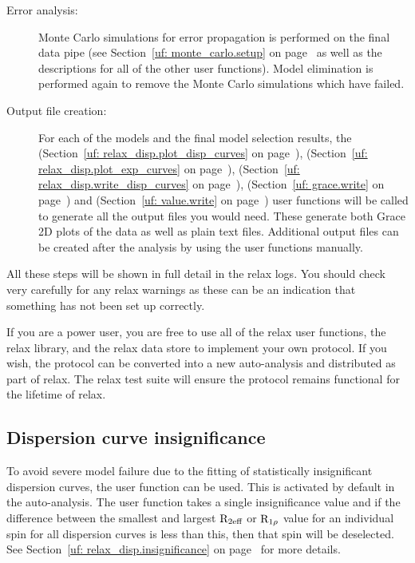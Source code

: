 \begin{description}
\item[Error analysis:]  Monte Carlo simulations for error propagation is performed on the final data pipe (see Section~\ref{uf: monte_carlo.setup} on page~\pageref{uf: monte_carlo.setup} as well as the descriptions for all of the other  user functions).  Model elimination is performed again to remove the Monte Carlo simulations which have failed.
\item[Output file creation:]  For each of the models and the final model selection results, the  (Section~\ref{uf: relax_disp.plot_disp_curves} on page~\pageref{uf: relax_disp.plot_disp_curves}),  (Section~\ref{uf: relax_disp.plot_exp_curves} on page~\pageref{uf: relax_disp.plot_exp_curves}),  (Section~\ref{uf: relax_disp.write_disp_curves} on page~\pageref{uf: relax_disp.write_disp_curves}),  (Section~\ref{uf: grace.write} on page~\pageref{uf: grace.write}) and  (Section~\ref{uf: value.write} on page~\pageref{uf: value.write}) user functions will be called to generate all the output files you would need.  These generate both Grace 2D plots of the data as well as plain text files.  Additional output files can be created after the analysis by using the user functions manually.
\end{description}

All these steps will be shown in full detail in the relax logs.
You should check very carefully for any relax warnings as these can be an indication that something has not been set up correctly.

If you are a power user, you are free to use all of the relax user functions, the relax library, and the relax data store to implement your own protocol.
If you wish, the protocol can be converted into a new auto-analysis and distributed as part of relax.
The relax test suite will ensure the protocol remains functional for the lifetime of relax.



\subsection{Dispersion curve insignificance}

To avoid severe model failure due to the fitting of statistically insignificant dispersion curves, the  user function can be used.
This is activated by default in the auto-analysis.
The user function takes a single insignificance value and if the difference between the smallest and largest $\mathrm{R}_\textrm{2eff}$ or $\mathrm{R}_{1\rho}$ value for an individual spin for all dispersion curves is less than this, then that spin will be deselected.
See Section~\ref{uf: relax_disp.insignificance} on page~\pageref{uf: relax_disp.insignificance} for more details.


